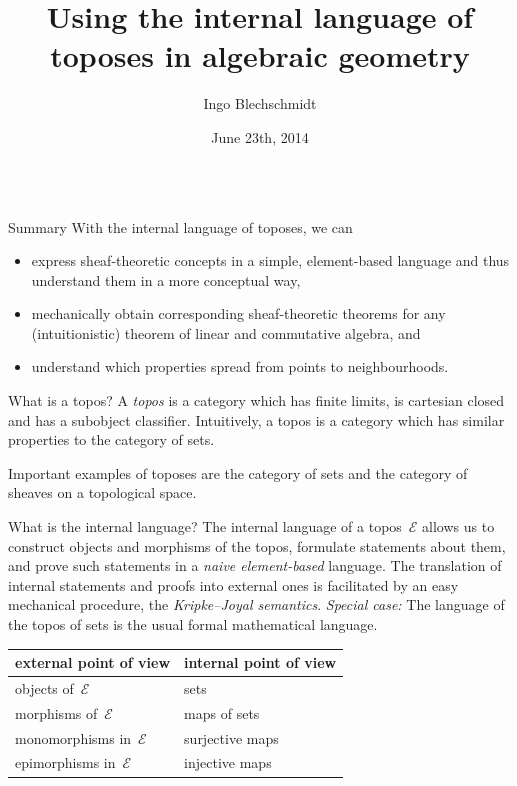 \documentclass[table]{beamer}
\title{Using the internal language of toposes in algebraic geometry}
\author{Ingo Blechschmidt}
\institute{University of Augsburg}
\date{June 23th, 2014}
\newcommand{\E}{\mathcal{E}}
\begin{document}
\begin{frame}[t]\begin{columns}[t]

\begin{column}{0.3\textwidth}
  \begin{alertblock}{Summary}
    With the internal language of toposes, we can
    \begin{itemize}\justifying
    \item express sheaf-theoretic
    concepts in a simple, ele\-ment-ba\-sed language and thus understand them
    in a more conceptual way,
    \item mechanically obtain
    corresponding sheaf-theo\-re\-tic theorems for any (intuitionistic) theorem of
    linear and commutative algebra, and
    \item understand which properties spread from
    points to neighbourhoods.
    \end{itemize}
  \end{alertblock}
  \bigskip

  \begin{block}{What is a topos?}
    A \emph{topos} is a category which has finite limits, is cartesian closed and
    has a subobject classifier. Intuitively, a topos is a category which has
    similar properties to the category of sets.\medskip

    Important examples of toposes are
    the category of sets and
    the category of sheaves on a topological space.
  \end{block}
  \bigskip

  \begin{block}{What is the internal language?}
    The internal language of a topos~$\E$ allows us to
    construct objects and morphisms of the topos,
    formulate statements about them, and
    prove such statements
    in a \emph{naive element-based} language.
    The translation of internal statements and proofs into external ones is
    facilitated by an easy mechanical procedure, the \emph{Kripke--Joyal
    semantics}.
    \emph{Special case:} The language of the topos of sets is the usual
    formal mathematical language.

    \begin{center}
      \begin{tabular}{ll}
        \toprule
        external point of view & internal point of view \\
        \midrule
        objects of~$\E$ & sets \\
        morphisms of~$\E$ & maps of sets \\
        monomorphisms in~$\E$ & surjective maps \\
        epimorphisms in~$\E$ & injective maps \\
        \bottomrule
      \end{tabular}
    \end{center}
  \end{block}


\end{column}
\end{columns}
\end{frame}
\end{document}
